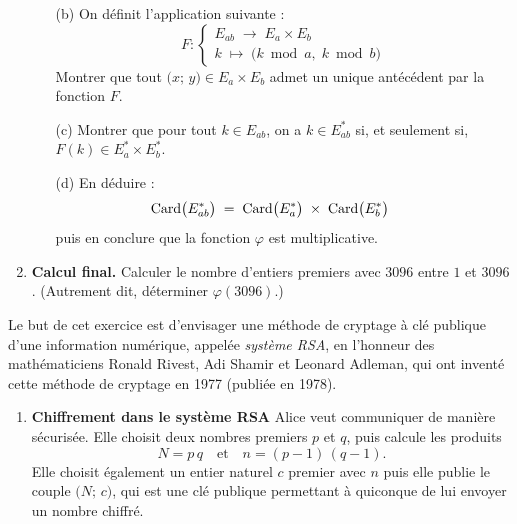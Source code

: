 \documentclass[a4paper,12pt]{article}
\begin{document}
\begin{multicols}{2}
\begin{exercice}[title=Exercice 27 $\star\star\star$ { [Chercher, Raisonner] }]{}{}
\begin{enumerate}
\begin{enumerate}
        \item[(b)] On définit l'application suivante :
          $$
          F:
          \begin{cases}
            E_{ab} \;\longrightarrow\; E_a \times E_b\\
            k \;\longmapsto\; \bigl(k \bmod a,\;k \bmod b\bigr)
          \end{cases}
          $$
          Montrer que tout \(\bigl(x;\,y\bigr) \in E_a \times E_b\) admet un unique antécédent par la fonction \(F\).

        \item[(c)] Montrer que pour tout \(k \in E_{ab}\), on a \(k \in E_{ab}^*\) si, et seulement si, \(F(k) \in E_a^* \times E_b^*\).

        \item[(d)] En déduire :
          \[
            \hspace*{-2em}\mathrm{Card}\bigl(E_{ab}^*\bigr)
            \;=\;
            \mathrm{Card}\bigl(E_a^*\bigr)
            \;\times\;
            \mathrm{Card}\bigl(E_b^*\bigr)
          \]
          puis en conclure que la fonction \(\varphi\) est multiplicative.
      \end{enumerate}

    \item \textbf{Calcul final.}
      Calculer le nombre d'entiers premiers avec \(3096\) entre \(1\) et \(3096\).
      (Autrement dit, déterminer \(\varphi(3096)\).)
  \end{enumerate}
\end{exercice}

\newpage

\begin{exercice}[title=Exercice 28 $\star\star\star$ { [Modéliser, Calculer] }]{}{}
  Le but de cet exercice est d'envisager une méthode de cryptage à clé publique d'une information numérique, appelée \emph{système RSA}, en l'honneur des mathématiciens Ronald Rivest, Adi Shamir et Leonard Adleman, qui ont inventé cette méthode de cryptage en 1977 (publiée en 1978).
  \begin{enumerate}
    \item \textbf{Chiffrement dans le système RSA}
      Alice veut communiquer de manière sécurisée. Elle choisit deux nombres premiers \(p\) et \(q\), puis calcule les produits
      \[
        N = p\,q
        \quad\text{et}\quad
        n = (p - 1)\,(q - 1).
      \]
      Elle choisit également un entier naturel \(c\) premier avec \(n\) puis elle publie le couple \(\bigl(N;\,c\bigr)\), qui est une clé publique permettant à quiconque de lui envoyer un nombre chiffré.


\end{enumerate}
\end{exercice}
\end{multicols}
\end{document}
